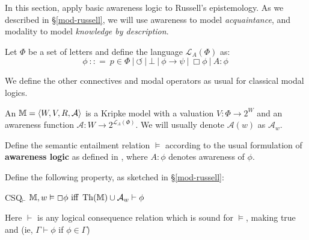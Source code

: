 In this section, apply basic awareness logic to Russell's
epistemology.  As we described in \S\ref{mod-russell}, we will use
awareness to model \emph{acquaintance}, and modality to model \emph{knowledge by description}.

\begin{definition}
  Let $\Phi$ be a set of letters and define the language $\mathcal{L}_A
  (\Phi)$ as:
  \[ \phi \  : : = \  p \in \Phi \  |
     \  \circlearrowleft \  | \  \bot
     \  | \  \phi \rightarrow \psi \  |
     \  \Box \phi \  | \  A : \phi \ 
  \]
\end{definition}

We define the other connectives and modal operators as usual for classical
modal logics.

\begin{definition}
  \label{awarenessmodels0}An {} $\mathbbm{M}= \langle
  W, V, R, \mathcal{A} \rangle$ is a Kripke model with a valuation $V : \Phi \rightarrow 2^W$ and an awareness function
  $\mathcal{A} : W \rightarrow 2^{\mathcal{L}_A (\Phi)}$.  We will
  usually denote $\mathcal{A} (w)$ as $\mathcal{A}_w$.
  
  Define the semantic entailment relation $\vDash$ according to the
  usual formulation of
  \textbf{awareness logic} as defined in \cite{fagin_belief_1988},
  where $A : \phi$ denotes awareness of $\phi$. 
\end{definition}

Define the following property, as sketched in \S\ref{mod-russell}:

\begin{definition}\label{csq0}
  \begin{descriptiondash}
    \item[CSQ$_\vdash$] $\mathbbm{M}, w \vDash \Box \phi \text{ iff } \tmop{Th}
    (\mathbbm{M}) \cup \mathcal{A}_w \vdash \phi$
  \end{descriptiondash}
  
  Here $\vdash$ is any logical consequence relation which is sound for
  $\vDash$, making true \tmtextbf{modus ponens} and  (ie,
  $\Gamma \vdash \phi$ if $\phi \in \Gamma$)
\end{definition}

